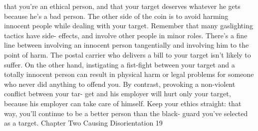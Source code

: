 \documentclass{book}
\begin{document}
that you're an ethical person, and that your target deserves 
whatever he gets because he’s a bad person. The other side of 
the coin is to avoid harming innocent people while dealing with 
your target. Remember that many gaslighting tactics have side- 
effects, and involve other people in minor roles. 
There's a fine line between involving an innocent person 
tangentially and involving him to the point of harm. The postal 
carrier who delivers a bill to your target isn't likely to suffer. On 
the other hand, instigating a fist-fight between your target and a 
totally innocent person can result in physical harm or legal 
problems for someone who never did anything to offend you. 
By contrast, provoking a non-violent conflict between your tar- 
get and his employer will hurt only your target, because his 
employer can take care of himself. Keep your ethics straight: 
that way, you'll continue to be a better person than the black- 
guard you've selected as a target.    Chapter Two 
Causing Disorientation 
19 
\end{document}
